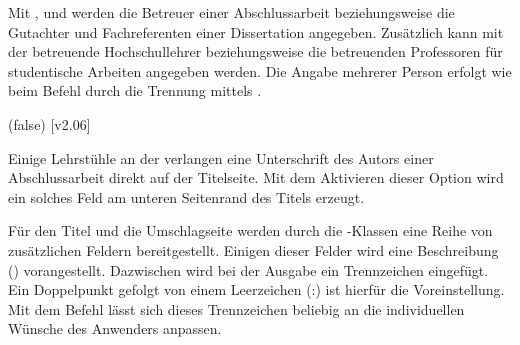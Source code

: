 \begin{DeclareEntity*}{}
\begin{DeclareEntity*}{}
\begin{DeclareEntity*}{}
\begin{Declaration}
\begin{Declaration}
\begin{Declaration}
\begin{Declaration}
Mit ,  und  werden die Betreuer 
einer Abschlussarbeit beziehungsweise die Gutachter und Fachreferenten einer 
Dissertation angegeben. Zusätzlich kann mit  der betreuende 
Hochschullehrer beziehungsweise die betreuenden Professoren für studentische 
Arbeiten angegeben werden. Die Angabe mehrerer Person erfolgt wie beim Befehl 
 durch die Trennung mittels .
\end{Declaration}
\end{Declaration}
\end{Declaration}
\end{Declaration}

\begin{Declaration}
  {}
  (false)
  [v2.06]
\printdeclarationlist

Einige Lehrstühle an der \TnUD verlangen eine Unterschrift des Autors einer 
Abschlussarbeit direkt auf der Titelseite. Mit dem Aktivieren dieser Option 
wird ein solches Feld am unteren Seitenrand des Titels erzeugt.
\end{Declaration}

\begin{Declaration}
  {}

Für den Titel und die Umschlagseite werden durch die \TUDScript-Klassen eine 
Reihe von zusätzlichen Feldern bereitgestellt. Einigen dieser Felder wird eine 
Beschreibung () vorangestellt. Dazwischen 
wird bei der Ausgabe ein Trennzeichen eingefügt. Ein Doppelpunkt gefolgt von 
einem Leerzeichen (:) ist hierfür die Voreinstellung. Mit 
dem Befehl  lässt sich dieses Trennzeichen beliebig an 
die individuellen Wünsche des Anwenders anpassen.
\end{Declaration}
%



\end{DeclareEntity*}
\end{DeclareEntity*}
\end{DeclareEntity*}
